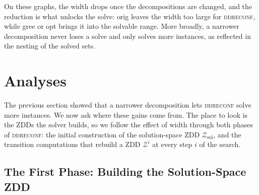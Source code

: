 \documentclass[conference]{IEEEtran}
\newcommand{\Z}{\mathcal{Z}}
\newcommand{\zsol}{\mathcal{Z}_{\mathrm{sol}}}
\newcommand{\OrigDecom}{\textsf{orig}\xspace}
\newcommand{\HeurDecom}{\textsf{gree}\xspace}
\newcommand{\OptDecom}{\textsf{opt}\xspace}
\begin{document}
On these graphs, the width drops once the decompositions are changed, and the reduction is what unlocks the solve: \OrigDecom leaves the width too large for \textsc{ddreconf}, while \HeurDecom or \OptDecom brings it into the solvable range.  
More broadly, a narrower decomposition never loses a solve and only solves more instances, as reflected in the nesting of the solved sets.

\section{Analyses}
\label{sec:analyses}

The previous section showed that a narrower decomposition lets \textsc{ddreconf} solve more instances. 
We now ask where these gains come from.
The place to look is the ZDDs the solver builds, so we follow the effect of width
through both phases of \textsc{ddreconf}: the initial construction of the
solution-space ZDD $\zsol$, and the transition computations that rebuild a ZDD $\Z^i$ at every step $i$ of the search.

\subsection{The First Phase: Building the Solution-Space ZDD}
\label{subsec:zddsize}
\end{document}
